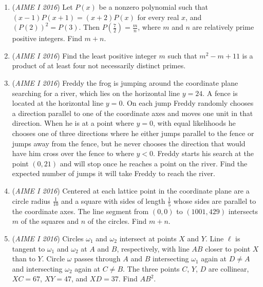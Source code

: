 \begin{enumerate}
 

	\item (\textit{AIME I 2016}) Let $P(x)$ be a nonzero polynomial such that $(x-1)P(x+1)=(x+2)P(x)$ for every real $x$, and $\left(P(2)\right)^2 = P(3)$. Then $P(\frac72)=\frac{m}{n}$, where $m$ and $n$ are relatively prime positive integers. Find $m + n$.


 

	\item (\textit{AIME I 2016}) Find the least positive integer $m$ such that $m^2 - m + 11$ is a product of at least four not necessarily distinct primes. 


 

	\item (\textit{AIME I 2016}) Freddy the frog is jumping around the coordinate plane searching for a river, which lies on the horizontal line $y = 24$. A fence is located at the horizontal line $y = 0$. On each jump Freddy randomly chooses a direction parallel to one of the coordinate axes and moves one unit in that direction. When he is at a point where $y=0$, with equal likelihoods he chooses one of three directions where he either jumps parallel to the fence or jumps away from the fence, but he never chooses the direction that would have him cross over the fence to where $y < 0$. Freddy starts his search at the point $(0, 21)$ and will stop once he reaches a point on the river. Find the expected number of jumps it will take Freddy to reach the river.


 

	\item (\textit{AIME I 2016}) Centered at each lattice point in the coordinate plane are a circle radius $\frac{1}{10}$ and a square with sides of length $\frac{1}{5}$ whose sides are parallel to the coordinate axes. The line segment from $(0,0)$ to $(1001, 429)$ intersects $m$ of the squares and $n$ of the circles. Find $m + n$.


 

	\item (\textit{AIME I 2016}) Circles $\omega_1$ and $\omega_2$ intersect at points $X$ and $Y$. Line $\ell$ is tangent to $\omega_1$ and $\omega_2$ at $A$ and $B$, respectively, with line $AB$ closer to point $X$ than to $Y$. Circle $\omega$ passes through $A$ and $B$ intersecting $\omega_1$ again at $D \neq A$ and intersecting $\omega_2$ again at $C \neq B$. The three points $C$, $Y$, $D$ are collinear, $XC = 67$, $XY = 47$, and $XD = 37$. Find $AB^2$.


 

\end{enumerate}